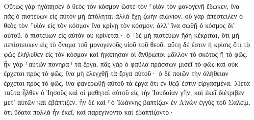 \documentclass{openreader}
\begin{document}
Οὕτως γὰρ ἠγάπησεν ὁ θεὸς τὸν κόσμον ὥστε τὸν ⸀υἱὸν τὸν μονογενῆ ἔδωκεν, ἵνα πᾶς ὁ πιστεύων εἰς αὐτὸν μὴ ἀπόληται ἀλλὰ ἔχῃ ζωὴν αἰώνιον. 
οὐ γὰρ ἀπέστειλεν ὁ θεὸς τὸν ⸀υἱὸν εἰς τὸν κόσμον ἵνα κρίνῃ τὸν κόσμον, ἀλλ’ ἵνα σωθῇ ὁ κόσμος δι’ αὐτοῦ. 
ὁ πιστεύων εἰς αὐτὸν οὐ κρίνεται· ὁ ⸀δὲ μὴ πιστεύων ἤδη κέκριται, ὅτι μὴ πεπίστευκεν εἰς τὸ ὄνομα τοῦ μονογενοῦς υἱοῦ τοῦ θεοῦ. 
αὕτη δέ ἐστιν ἡ κρίσις ὅτι τὸ φῶς ἐλήλυθεν εἰς τὸν κόσμον καὶ ἠγάπησαν οἱ ἄνθρωποι μᾶλλον τὸ σκότος ἢ τὸ φῶς, ἦν γὰρ ⸂αὐτῶν πονηρὰ⸃ τὰ ἔργα. 
πᾶς γὰρ ὁ φαῦλα πράσσων μισεῖ τὸ φῶς καὶ οὐκ ἔρχεται πρὸς τὸ φῶς, ἵνα μὴ ἐλεγχθῇ τὰ ἔργα αὐτοῦ· 
ὁ δὲ ποιῶν τὴν ἀλήθειαν ἔρχεται πρὸς τὸ φῶς, ἵνα φανερωθῇ αὐτοῦ τὰ ἔργα ὅτι ἐν θεῷ ἐστιν εἰργασμένα. 
Μετὰ ταῦτα ἦλθεν ὁ Ἰησοῦς καὶ οἱ μαθηταὶ αὐτοῦ εἰς τὴν Ἰουδαίαν γῆν, καὶ ἐκεῖ διέτριβεν μετ’ αὐτῶν καὶ ἐβάπτιζεν. 
ἦν δὲ καὶ ⸀ὁ Ἰωάννης βαπτίζων ἐν Αἰνὼν ἐγγὺς τοῦ Σαλείμ, ὅτι ὕδατα πολλὰ ἦν ἐκεῖ, καὶ παρεγίνοντο καὶ ἐβαπτίζοντο· 
\end{document}
